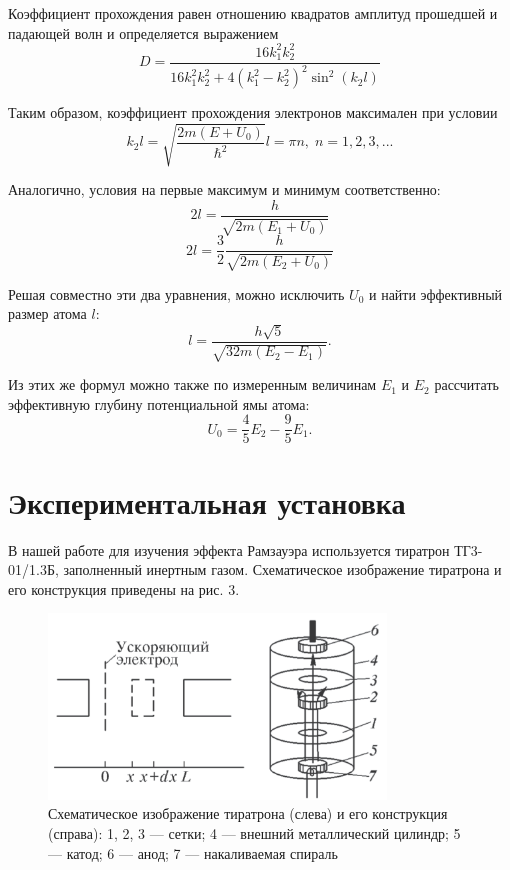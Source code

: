 \documentclass[12pt,a4paper]{article}
\begin{document}
	Коэффициент прохождения равен отношению квадратов амплитуд прошедшей и падающей волн и определяется выражением
	\begin{equation}
		D = \frac{16 k_1^2 k_2^2}{16 k_1^2 k_2^2 + 4(k_1^2 - k_2^2)^2 \sin^2{(k_2 l)}}
	\end{equation}
	
	Таким образом, коэффициент прохождения электронов максимален при условии
	\begin{equation}
		k_2 l = \sqrt{\frac{2m(E + U_0)}{\hbar^2}}l = \pi n, \; n = 1, 2, 3, ...
		\label{En}
	\end{equation}
	
	Аналогично, условия на первые максимум и минимум соответственно:
	\begin{equation}
		2l = \frac{h}{\sqrt{2m(E_1 + U_0)}}
		\label{E1}
	\end{equation}
	\begin{equation}
		2l = \frac{3}{2}\frac{h}{\sqrt{2m(E_2 + U_0)}}
		\label{E2}
	\end{equation}
	
	Решая совместно эти два уравнения, можно исключить $U_0$ и найти эффективный размер атома $l$:
	\begin{equation}
		l = \frac{h\sqrt{5}}{\sqrt{32m(E_2 - E_1)}}.
		\label{E2E1}
	\end{equation}

	Из этих же формул можно также по измеренным величинам $E_1$ и $E_2$ рассчитать эффективную глубину потенциальной ямы атома:
	\begin{equation}
		U_0 = \frac{4}{5}E_2 - \frac{9}{5}E_1.
		\label{U_0}
	\end{equation}
 	
 
\section*{Экспериментальная установка}
	
В нашей работе для изучения эффекта Рамзауэра используется тиратрон ТГ3-01/1.3Б, заполненный инертным газом. Схематическое изображение тиратрона и его конструкция приведены на рис. 3.
	
	\begin{figure}
		\includegraphics[width=0.8\textwidth]{res/3.png}
		\caption{Схематическое изображение тиратрона (слева) и его конструкция (справа): 1, 2, 3 — сетки; 4 — внешний металлический цилиндр; 5 — катод; 6 — анод; 7 — накаливаемая спираль}
	\end{figure}
\end{document}
